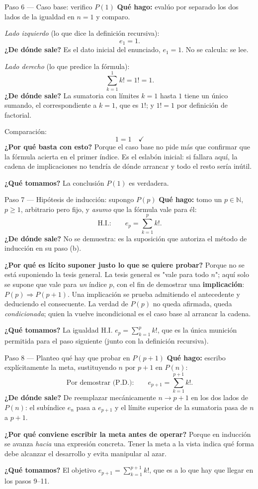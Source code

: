 \documentclass[11pt]{article}
\begin{document}
\begin{paso}{Paso 6 --- Caso base: verifico $P(1)$}
\textbf{Qué hago:} evalúo por separado los dos lados de la igualdad en $n=1$ y comparo.

\emph{Lado izquierdo} (lo que dice la definición recursiva):
\[
e_1 = 1 .
\]
\textbf{¿De dónde sale?} Es el dato inicial del enunciado, $e_1=1$. No se calcula: se lee.

\emph{Lado derecho} (lo que predice la fórmula):
\[
\sum_{k=1}^{1}k! = 1! = 1 .
\]
\textbf{¿De dónde sale?} La sumatoria con límites $k=1$ hasta $1$ tiene un único sumando, el correspondiente a $k=1$, que es $1!$; y $1!=1$ por definición de factorial.

Comparación:
\[
1 = 1 \quad\checkmark
\]
\textbf{¿Por qué basta con esto?} Porque el caso base no pide más que confirmar que la fórmula acierta en el primer índice. Es el eslabón inicial: si fallara aquí, la cadena de implicaciones no tendría de dónde arrancar y todo el resto sería inútil.

\textbf{¿Qué tomamos?} La conclusión $P(1)$ es verdadera.
\end{paso}

\begin{paso}{Paso 7 --- Hipótesis de inducción: supongo $P(p)$}
\textbf{Qué hago:} tomo un $p\in\mathbb{N}$, $p\ge 1$, arbitrario pero fijo, y \emph{asumo} que la fórmula vale para él:
\[
\text{H.I.:}\qquad e_p=\sum_{k=1}^{p}k! .
\]
\textbf{¿De dónde sale?} No se demuestra: es la suposición que autoriza el método de inducción en su paso (b).

\textbf{¿Por qué es lícito suponer justo lo que se quiere probar?} Porque no se está suponiendo la tesis general. La tesis general es "vale para todo $n$"; aquí solo se supone que vale para \emph{un} índice $p$, con el fin de demostrar una \textbf{implicación}: $P(p)\Rightarrow P(p+1)$. Una implicación se prueba admitiendo el antecedente y deduciendo el consecuente. La verdad de $P(p)$ no queda afirmada, queda \emph{condicionada}; quien la vuelve incondicional es el caso base al arrancar la cadena.

\textbf{¿Qué tomamos?} La igualdad H.I. $e_p=\sum_{k=1}^{p}k!$, que es la única munición permitida para el paso siguiente (junto con la definición recursiva).
\end{paso}

\begin{paso}{Paso 8 --- Planteo qué hay que probar en $P(p+1)$}
\textbf{Qué hago:} escribo explícitamente la meta, sustituyendo $n$ por $p+1$ en $P(n)$:
\[
\text{Por demostrar (P.D.):}\qquad e_{p+1}=\sum_{k=1}^{p+1}k! .
\]
\textbf{¿De dónde sale?} De reemplazar mecánicamente $n\to p+1$ en los dos lados de $P(n)$: el subíndice $e_n$ pasa a $e_{p+1}$ y el límite superior de la sumatoria pasa de $n$ a $p+1$.

\textbf{¿Por qué conviene escribir la meta antes de operar?} Porque en inducción se avanza \emph{hacia} una expresión concreta. Tener la meta a la vista indica qué forma debe alcanzar el desarrollo y evita manipular al azar.

\textbf{¿Qué tomamos?} El objetivo $e_{p+1}=\sum_{k=1}^{p+1}k!$, que es a lo que hay que llegar en los pasos 9--11.
\end{paso}
\end{document}
